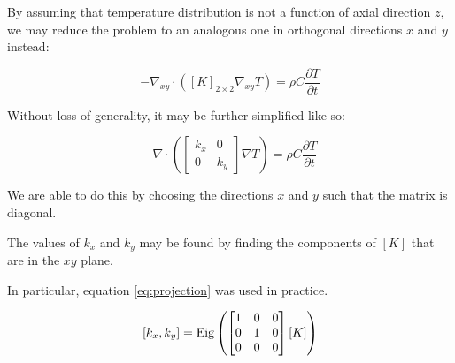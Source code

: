 By assuming that temperature distribution is not a function of axial direction
\(z\), we may reduce the problem to an analogous one in orthogonal directions
\(x\) and \(y\) instead:

\begin{equation}
-\nabla_{xy} \cdot \left([K]_{2 \times 2}\nabla_{xy} T \right)= \rho C\frac{\partial T}{\partial t}
\end{equation}

Without loss of generality, it may be further simplified like so:

\begin{equation}
-\nabla \cdot \left(\begin{bmatrix}k_x & 0\\ 0 & k_y\end{bmatrix}\nabla T \right)= \rho C\frac{\partial T}{\partial t}
\end{equation}

We are able to do this by choosing the directions \(x\) and \(y\) such that the
matrix is diagonal.

The values of \(k_x\) and \(k_y\) may be found by finding the components of
\([K]\) that are in the \(xy\) plane.

In particular, equation \ref{eq:projection} was used in practice.

\begin{equation}
\label{eq:projection}
\left[ k_x, k_y \right] = 
\textrm{Eig}\left(\begin{bmatrix} 1 & 0 & 0 \\ 0 & 1 & 0\\ 0 & 0 & 0\end{bmatrix}
\left[K\right]\right)
\end{equation}


